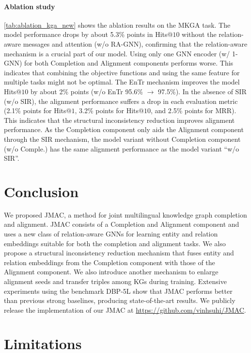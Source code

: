 \documentclass[11pt]{article}
\begin{document}
\paragraph{Ablation study} \autoref{tab:ablation_kga_new} shows the ablation results on the MKGA task. 
The model performance drops by about 5.3\% points in Hits@$10$ without the relation-aware messages and attention (w/o RA-GNN), confirming that the relation-aware mechanism is a crucial part of our model. 
Using only one GNN encoder (w/ 1-GNN) for both Completion and Alignment components  performs worse. This indicates that combining the objective functions and using the same feature for multiple tasks might not be optimal. 
The EnTr mechanism improves the model Hits@$10$ by about 2\% points (w/o EnTr 95.6\%  $\rightarrow$ 97.5\%). 
In the absence of SIR (w/o SIR), the alignment performance suffers a drop in each evaluation metric (2.1\% points for Hits@$1$, 3.2\% points for Hits@$10$, and 2.5\% points for MRR). This indicates that the structural inconsistency reduction improves alignment performance. 
As the Completion component only aids the Alignment component through the SIR mechanism, the model variant without Completion component (w/o Comple.)  has the same alignment performance as the model variant ``w/o SIR''. 





\section{Conclusion}

We proposed JMAC, a method for joint multilingual knowledge graph completion and alignment. JMAC consists of a Completion and Alignment component and uses a new class of relation-aware GNNs for learning entity and relation embeddings suitable for both the completion and alignment tasks. We also propose a structural inconsistency reduction mechanism that fuses entity and relation embeddings from the Completion component with those of the Alignment component. We also introduce another mechanism to enlarge alignment seeds and transfer triples among KGs during training. Extensive experiments using the benchmark DBP-5L \cite{chen2020multilingual} show that JMAC performs better than previous strong baselines, producing state-of-the-art results. We publicly release the implementation of our JMAC at \url{https://github.com/vinhsuhi/JMAC}.



\section*{Limitations}
\end{document}
